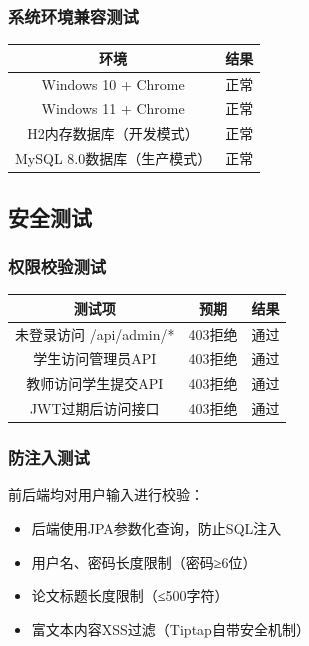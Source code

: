 \documentclass[a4paper,12pt]{article}
\begin{document}
\subsubsection{系统环境兼容测试}
\begin{center}
\begin{tabular}{|c|c|}
\hline
环境 & 结果 \\
\hline
Windows 10 + Chrome & 正常 \\
Windows 11 + Chrome & 正常 \\
H2内存数据库（开发模式） & 正常 \\
MySQL 8.0数据库（生产模式） & 正常 \\
\hline
\end{tabular}
\end{center}

\subsection{安全测试}
\subsubsection{权限校验测试}
\begin{center}
\begin{tabular}{|c|c|c|}
\hline
测试项 & 预期 & 结果 \\
\hline
未登录访问 /api/admin/* & 403拒绝 & 通过 \\
学生访问管理员API & 403拒绝 & 通过 \\
教师访问学生提交API & 403拒绝 & 通过 \\
JWT过期后访问接口 & 403拒绝 & 通过 \\
\hline
\end{tabular}
\end{center}

\subsubsection{防注入测试}
前后端均对用户输入进行校验：
\begin{itemize}
  \item 后端使用JPA参数化查询，防止SQL注入
  \item 用户名、密码长度限制（密码≥6位）
  \item 论文标题长度限制（≤500字符）
  \item 富文本内容XSS过滤（Tiptap自带安全机制）
\end{itemize}
\end{document}
